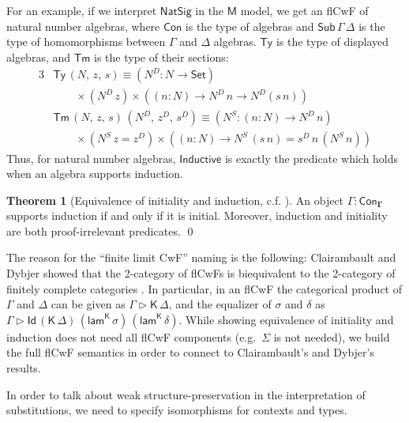 \documentclass{article}
\theoremstyle{definition}
\theoremstyle{theorem}
\newtheorem{theorem}{Theorem}
\newcommand{\Con}{\mathsf{Con}}
\newcommand{\Sub}{\mathsf{Sub}}
\newcommand{\Tm}{\mathsf{Tm}}
\newcommand{\Ty}{\mathsf{Ty}}
\newcommand{\Id}{\mathsf{Id}}
\newcommand{\Set}{\mathsf{Set}}
\newcommand{\ext}{\triangleright}
\newcommand{\Inductive}{\mathsf{Inductive}}
\newcommand{\NatSig}{\mathsf{NatSig}}
\newcommand{\Kfam}{\mathsf{K}}
\newcommand{\K}{\mathsf{K}}
\newcommand{\lamK}{\mathsf{lam}^{\K}}
\newcommand{\bGamma}{\boldsymbol{\Gamma}}
\newcommand{\bM}{\boldsymbol{\mathsf{M}}}
\begin{document}
For an example, if we interpret $\mathsf{\NatSig}$ in the $\bM$ model, we get an
flCwF of natural number algebras, where $\Con$ is the type of algebras and
$\Sub\,\Gamma\,\Delta$ is the type of homomorphisms between $\Gamma$ and
$\Delta$ algebras. $\Ty$ is the type of displayed algebras, and $\Tm$ is the
type of their sections:
\begin{alignat*}{3}
  & \Ty\,(N,\,z,\,s) \equiv(N^D : N \to \Set)\\ & \hspace{2em}\times (N^D\,z)
  \times ((n : N)\to N^D\,n \to N^D(s\,n))\\ &
  \Tm\,(N,\,z,\,s)\,(N^D,\,z^D,\,s^D) \equiv (N^S : (n : N)\to
  N^D\,n)\\ & \hspace{2em}\times (N^S\,z = z^D)\times ((n : N) \to N^S\,(s\,n) =
  s^D\,n\,(N^S\,n))
\end{alignat*}
Thus, for natural number algebras, $\Inductive$ is exactly the predicate which
holds when an algebra supports induction.


\begin{theorem}[Equivalence of initiality and induction, c.f. \cite{kaposi2019constructing}]
\label{thm:initialind} An object $\Gamma : \Con_{\bGamma}$ supports induction if and only if it is
initial. Moreover, induction and initiality are both proof-irrelevant
predicates. \qed
\end{theorem}

The reason for the ``finite limit CwF'' naming is the following: Clairambault
and Dybjer showed that the 2-category of flCwFs is biequivalent to the
2-category of finitely complete categories
\cite{clairambault2014biequivalence}. In particular, in an flCwF the categorical
product of $\Gamma$ and $\Delta$ can be given as $\Gamma \ext \Kfam\, \Delta$,
and the equalizer of $\sigma$ and $\delta$ as $\Gamma\ext
\Id\,(\K\,\Delta)\,(\lamK\,\sigma)\,(\lamK\,\delta)$. While showing equivalence
of initiality and induction does not need all flCwF components (e.g.\ $\Sigma$
is not needed), we build the full flCwF semantics in order to connect to
Clairambault's and Dybjer's results.

In order to talk about weak structure-preservation in the interpretation of
substitutions, we need to specify isomorphisms for contexts and types.
\end{document}
